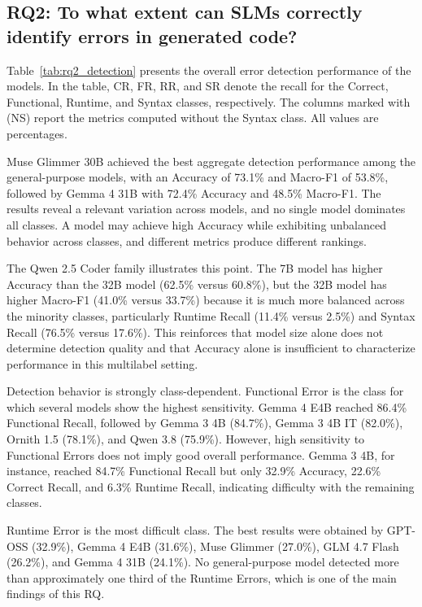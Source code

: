 \subsection{RQ2: To what extent can SLMs correctly identify errors in generated code?}
\label{sec:rq2}

Table~\ref{tab:rq2_detection} presents the overall error detection performance of the models. In the table, CR, FR, RR, and SR denote the recall for the Correct, Functional, Runtime, and Syntax classes, respectively. The columns marked with (NS) report the metrics computed without the Syntax class. All values are percentages.

Muse Glimmer 30B achieved the best aggregate detection performance among the general-purpose models, with an Accuracy of 73.1\% and Macro-F1 of 53.8\%, followed by Gemma 4 31B with 72.4\% Accuracy and 48.5\% Macro-F1. The results reveal a relevant variation across models, and no single model dominates all classes. A model may achieve high Accuracy while exhibiting unbalanced behavior across classes, and different metrics produce different rankings.

The Qwen 2.5 Coder family illustrates this point. The 7B model has higher Accuracy than the 32B model (62.5\% versus 60.8\%), but the 32B model has higher Macro-F1 (41.0\% versus 33.7\%) because it is much more balanced across the minority classes, particularly Runtime Recall (11.4\% versus 2.5\%) and Syntax Recall (76.5\% versus 17.6\%). This reinforces that model size alone does not determine detection quality and that Accuracy alone is insufficient to characterize performance in this multilabel setting.

Detection behavior is strongly class-dependent. Functional Error is the class for which several models show the highest sensitivity. Gemma 4 E4B reached 86.4\% Functional Recall, followed by Gemma 3 4B (84.7\%), Gemma 3 4B IT (82.0\%), Ornith 1.5 (78.1\%), and Qwen 3.8 (75.9\%). However, high sensitivity to Functional Errors does not imply good overall performance. Gemma 3 4B, for instance, reached 84.7\% Functional Recall but only 32.9\% Accuracy, 22.6\% Correct Recall, and 6.3\% Runtime Recall, indicating difficulty with the remaining classes.

Runtime Error is the most difficult class. The best results were obtained by GPT-OSS (32.9\%), Gemma 4 E4B (31.6\%), Muse Glimmer (27.0\%), GLM 4.7 Flash (26.2\%), and Gemma 4 31B (24.1\%). No general-purpose model detected more than approximately one third of the Runtime Errors, which is one of the main findings of this RQ.

